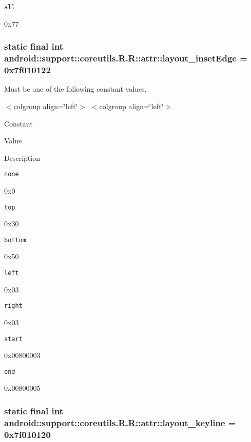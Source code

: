 {\tt all}

0x77\hypertarget{classandroid_1_1support_1_1coreutils_1_1_r_1_1attr_ba2547679b87c137bf6438e34b9b4a58}{
\subsubsection[{layout\_\-insetEdge}]{\setlength{\rightskip}{0pt plus 5cm}static final int android::support::coreutils.R.R::attr::layout\_\-insetEdge = 0x7f010122}}
\label{classandroid_1_1support_1_1coreutils_1_1_r_1_1attr_ba2547679b87c137bf6438e34b9b4a58}


Must be one of the following constant values. \begin{TabularC}{0}
\hline
\end{TabularC}
$<$colgroup align=\char`\"{}left\char`\"{}$>$ $<$colgroup align=\char`\"{}left\char`\"{}$>$ 

Constant

Value

Description 

{\tt none}

0x0

{\tt top}

0x30

{\tt bottom}

0x50

{\tt left}

0x03

{\tt right}

0x03

{\tt start}

0x00800003

{\tt end}

0x00800005\hypertarget{classandroid_1_1support_1_1coreutils_1_1_r_1_1attr_21bc8b76ae561d732ecd669794f4453f}{
\subsubsection[{layout\_\-keyline}]{\setlength{\rightskip}{0pt plus 5cm}static final int android::support::coreutils.R.R::attr::layout\_\-keyline = 0x7f010120}}
\label{classandroid_1_1support_1_1coreutils_1_1_r_1_1attr_21bc8b76ae561d732ecd669794f4453f}


